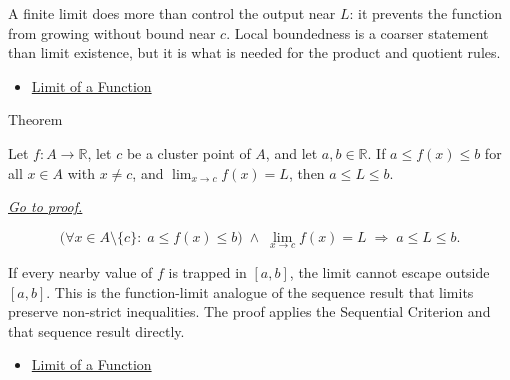 \begin{remark*}[Interpretation]
A finite limit does more than control the output near $L$: it
prevents the function from growing without bound near $c$. Local
boundedness is a coarser statement than limit existence, but it is
what is needed for the product and quotient rules.
\end{remark*}

\begin{dependencies}
\begin{itemize}
  \item \hyperref[def:limit-function]{Limit of a Function}
\end{itemize}
\end{dependencies}


\begin{theorembox}{Theorem}
\begin{theorem}
\label{thm:bounded-limits}
Let $f : A \to \mathbb{R}$, let $c$ be a cluster point of $A$, and
let $a, b \in \mathbb{R}$. If $a \leq f(x) \leq b$ for all $x \in A$
with $x \neq c$, and $\lim_{x\to c}f(x)=L$, then
$a \leq L \leq b$.

\smallskip\noindent
\hyperref[prf:bounded-limits]{\textit{Go to proof.}}
\end{theorem}
\end{theorembox}

\begin{remark*}
\[
  \bigl(\forall x \in A \setminus \{c\} :\; a \leq f(x) \leq b\bigr)
  \;\wedge\;
  \lim_{x\to c}f(x)=L
  \;\Rightarrow\;
  a \leq L \leq b.
\]
\end{remark*}

\begin{remark*}[Interpretation]
If every nearby value of $f$ is trapped in $[a,b]$, the limit cannot
escape outside $[a,b]$. This is the function-limit analogue of the
sequence result that limits preserve non-strict inequalities. The
proof applies the Sequential Criterion and that sequence result
directly.
\end{remark*}

\begin{dependencies}
\begin{itemize}
  \item \hyperref[def:limit-function]{Limit of a Function}
\end{itemize}
\end{dependencies}

